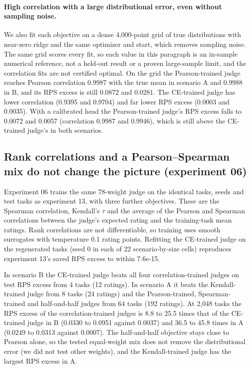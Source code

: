 \paragraph{High correlation with a large distributional error, even without sampling noise.}
We also fit each objective on a dense 4{,}000-point grid of true distributions with near-zero ridge and the same optimizer and start, which removes sampling noise.
The same grid scores every fit, so each value in this paragraph is an in-sample numerical reference, not a held-out result or a proven large-sample limit, and the correlation fits are not certified optimal.
On the grid the Pearson-trained judge reaches Pearson correlation 0.9987 with the true mean in scenario A and 0.9988 in B, and its RPS excess is still 0.0872 and 0.0281.
The CE-trained judge has lower correlation (0.9395 and 0.9704) and far lower RPS excess (0.0003 and 0.0035).
With a calibrated head the Pearson-trained judge's RPS excess falls to 0.0072 and 0.0057 (correlation 0.9987 and 0.9946), which is still above the CE-trained judge's in both scenarios.

\subsection{Rank correlations and a Pearson--Spearman mix do not change the picture (experiment 06)}
\label{app:controlled-rank}

Experiment 06 trains the same 78-weight judge on the identical tasks, seeds and test tasks as experiment 13, with three further objectives. These are the Spearman correlation, Kendall's $\tau$ and the average of the Pearson and Spearman correlations between the judge's expected rating and the training-task mean ratings.
Rank correlations are not differentiable, so training uses smooth surrogates with temperature 0.1 rating points.
Refitting the CE-trained judge on the regenerated tasks (seed 0 in each of 22 scenario-by-size cells) reproduces experiment 13's saved RPS excess to within 7.6e-15.

In scenario B the CE-trained judge beats all four correlation-trained judges on test RPS excess from 4 tasks (12 ratings).
In scenario A it beats the Kendall-trained judge from 8 tasks (24 ratings) and the Pearson-trained, Spearman-trained and half-and-half judges from 64 tasks (192 ratings).
At 2{,}048 tasks the RPS excess of the correlation-trained judges is 8.8 to 25.5 times that of the CE-trained judge in B (0.0330 to 0.0951 against 0.0037) and 36.5 to 45.8 times in A (0.0249 to 0.0313 against 0.0007).
The half-and-half objective stays close to Pearson alone, so the tested equal-weight mix does not remove the distributional error (we did not test other weights), and the Kendall-trained judge has the largest RPS excess in A.

